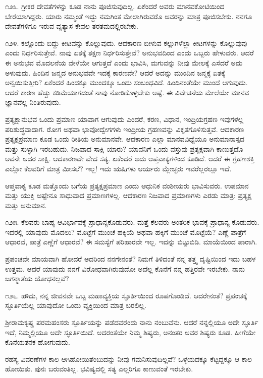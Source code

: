 ೧೨೩. ಗ್ರೀಕರ ದೇವತೆಗಳನ್ನು ಕೂಡ ನಾನು ಪೂಜಿಸುವುದಿಲ್ಲ. ಏಕೆಂದರೆ ಅವರು ಮಾನವಕೋಟಿಯಿಂದ ಬೇರೆಯಾಗಿದ್ದರು. ಯಾರು ನಮ್ಮಂತೆ ಇದ್ದು ನಮಗಿಂತ ಮೇಲಾಗಿರುವರೊ ಅವರನ್ನು ಮಾತ್ರ ಪೂಜಿಸಬೇಕು. ನನಗೂ ದೇವತೆಗಳಿಗೂ ಇರುವ ವ್ಯತ್ಯಾಸ ಕೇವಲ ತರತಮದಲ್ಲಿರಬೇಕು.

೧೨೪. ಕಲ್ಲೊಂದು ಬಿದ್ದು ಕೀಟವನ್ನು ಕೊಲ್ಲುವುದು. ಆದಕಾರಣ ಬೀಳುವ ಕಲ್ಲುಗಳೆಲ್ಲಾ ಕೀಟಗಳನ್ನು ಕೊಲ್ಲುವುವು ಎಂದು ನಿರ್ಧರಿಸುತ್ತೇವೆ. ನಾವು ಏತಕ್ಕೆ ತಕ್ಷಣ ನಿರ್ಧರಿಸುತ್ತೇವೆ? ಅನುಭವದಿಂದ ಎಂದು ಒಬ್ಬರು ಹೇಳುವರು. ಆದರೆ ಈ ಅನುಭವ ಮೊದಲನೆಯ ವೇಳೆಯೇ ಆಗುತ್ತದೆ ಎಂದು ಭಾವಿಸಿ, ಮಗುವನ್ನು ನೀವು ಮೇಲಕ್ಕೆ ಎಸೆದರೆ ಅದು ಅಳುವುದು. ಹಿಂದಿನ ಜನ್ಮದ ಅನುಭವವೇ ಇದಕ್ಕೆ ಕಾರಣವೇ? ಆದರೆ ಅದನ್ನು ಮುಂದಿನ ಜನ್ಮಕ್ಕೆ ಏತಕ್ಕೆ ಅನ್ವಯಿಸುತ್ತೀರಿ? ಏಕೆಂದರೆ ಹಿಂದಕ್ಕೂ ಮುಂದಕ್ಕೂ ಒಂದು ಸಂಬಂಧವಿದೆ. ಹಿಂದಿನಂತೆಯೇ ಮುಂದೆ ಆಗುವುದು. ಆದರೆ ಕಾರಣ ಹೆಚ್ಚು ಕಡಿಮೆಯಾಗದಂತೆ ನಾವು ನೋಡಿಕೊಳ್ಳಬೇಕು ಅಷ್ಟೆ. ಈ ವಿವೇಚನೆಯ ಮೇಲೆಯೇ ಮಾನವ ಜ್ಞಾನವೆಲ್ಲ ನಿಂತಿರುವುದು.

ಪ್ರತ್ಯಕ್ಷಾನುಭವ ಒಂದು ಪ್ರಮಾಣ ಯಾವಾಗ ಆಗುವುದು ಎಂದರೆ, ಕರಣ, ವಿಧಾನ, ಇಂದ್ರಿಯಗ್ರಹಣ ಇವುಗಳೆಲ್ಲ ಪರಿಶುದ್ಧವಾದಾಗ. ರೋಗ ಅಥವಾ ಭಾವೋದ್ವೇಗಗಳು ಇಂದ್ರೀಯ ಗ್ರಹಣವನ್ನು ವಿಕೃತಗೊಳಿಸುತ್ತವೆ. ಆದಕಾರಣ ಪ್ರತ್ಯಕ್ಷಪ್ರಮಾಣ ಕೂಡ ಒಂದು ರೀತಿಯ ಅನುಮಾನವೇ. ಆದಕಾರಣ ಎಲ್ಲಾ ಮಾನವವಿಧ್ಯೆಯೂ ಅನುಮಾನಾಸ್ಪದ ಮತ್ತು ಸುಳ್ಳಾಗಿ ಇರಬಹುದು. ನಿಜವಾದ ಸಾಕ್ಷಿ ಯಾರು? ಯಾವನಿಗೆ ಒಂದು ವಸ್ತುವು ಪ್ರತ್ಯಕ್ಷವಾಗಿ ಕಾಣುತ್ತದೊ ಅವನೇ ಅದರ ಸಾಕ್ಷಿ. ಆದಕಾರಣವೇ ವೇದ ಸತ್ಯ. ಏಕೆಂದರೆ ಅದು ಆಪ್ತವಾಕ್ಯಗಳಿಂದ ಕೂಡಿದೆ. ಆದರೆ ಈ ಗ್ರಹಣಶಕ್ತಿ ಎಲ್ಲೋ ಕೆಲವರಿಗೆ ಮಾತ್ರ ಮೀಸಲೆ? ಇಲ್ಲ! ಇದು ಋಷಿಗಳು ಆರ್ಯರು ಮ್ಲೇಚ್ಛರು ಇವರೆಲ್ಲರಲ್ಲೂ ಇದೆ.

ಆಪ್ತವಾಕ್ಯ ಕೂಡ ಮತ್ತೊಂದು ಬಗೆಯ ಪ್ರತ್ಯಕ್ಷಪ್ರಮಾಣ ಎಂದು ಆಧುನಿಕ ವಂಶೀಯರು ಭಾವಿಸುವರು. ಉಪಮಾನ ಮತ್ತು ಯುಕ್ತಿ ಅಷ್ಟೇನೂ ಸಾಧುವಾದ ಪ್ರಮಾಣಗಳಲ್ಲ. ಆದಕಾರಣ ನಿಜವಾದ ಪ್ರಮಾಣಗಳು ಎರಡು ಮಾತ್ರ: ಪ್ರತ್ಯಕ್ಷ ಮತ್ತು ಅನುಮಾನ.

೧೨೫. ಕೆಲವರು ಬಾಹ್ಯ ಆವಿರ್ಭಾವಕ್ಕೆ ಪ್ರಾಧಾನ್ಯಕೊಡುವರು. ಮತ್ತೆ ಕೆಲವರು ಅಂತರಿಕ ಭಾವಕ್ಕೆ ಪ್ರಾಧಾನ್ಯ ಕೊಡುವರು. ಇದರಲ್ಲಿ ಯಾವುದು ಮೊದಲು? ಮೊಟ್ಟೆಗೆ ಮುಂಚೆ ಹಕ್ಕಿಯೆ ಅಥವಾ ಹಕ್ಕಿಗೆ ಮುಂಚೆ ಮೊಟ್ಟೆಯೆ? ಎಣ್ಣೆ ಪಾತ್ರೆಗೆ ಆಧಾರವೆ, ಪಾತ್ರೆ ಎಣ್ಣೆಗೆ ಆಧಾರವೆ? ಈ ಸಮಸ್ಯೆಗೆ ಪರಿಹಾರವೇ ಇಲ್ಲ. ಇದನ್ನು ಬಿಟ್ಟುಬಿಡಿ. ಮಾಯೆಯಿಂದ ಪಾರಾಗಿ.

ಪ್ರಪಂಚವೇ ಮಾಯವಾಗಿ ಹೋದರೆ ಅದರಿಂದ ನನಗೇನಂತೆ? ನಿಮಗೆ ತಿಳಿದಂತೆ ನನ್ನ ತತ್ತ್ವ ದೃಷ್ಟಿಯಿಂದ ಇದು ಬಹಳ ಉತ್ತಮ. ಆದರೆ ಯಾವುದು ನನಗೆ ವಿರೋಧವಾಗಿರುವುದೋ ಅದೆಲ್ಲ ಕೊನೆಗೆ ನನ್ನ ಹತ್ತಿರವೇ ಇರಬೇಕು. ನಾನು ಜಗನ್ಮಾತೆಯ ಯೋಧನಲ್ಲವೆ?

೧೨೬. ಹೌದು, ನನ್ನ ಜೀವನವೇ ಒಬ್ಬ ಮಹಾವ್ಯಕ್ತಿಯ ಸ್ಫೂರ್ತಿಯಿಂದ ರೂಪಗೊಂಡಿದೆ. ಆದರೇನಂತೆ? ಪ್ರಪಂಚಕ್ಕೆ ಸ್ಫೂರ್ತಿಯೆಲ್ಲ ಯಾವುದೋ ಒಂದು ವ್ಯಕ್ತಿಯಿಂದ ಮಾತ್ರ ಬರಲಿಲ್ಲ.

ಶ‍್ರೀರಾಮಕೃಷ್ಣ ಪರಮಹಂಸರು ಸ್ಫೂರ್ತಿಯನ್ನು ಪಡೆದವರೆಂದು ನಾನು ನಂಬುವೆನು. ಆದರೆ ನನ್ನಲ್ಲಿಯೂ ಅದೇ ಸ್ಫೂರ್ತಿ ಇದೆ, ನಿಮ್ಮಲ್ಲಿಯೂ ಅದೇ ಸ್ಫೂರ್ತಿಯಿದೆ. ಅದರಂತೆಯೇ ನಿಮ್ಮ ಶಿಷ್ಯರು, ಅನಂತರ ಅವರ ಶಿಷ್ಯರು ಕೂಡ. ಹೀಗೆಯೇ ಕೊನೆಯತನಕ ಹೋಗುವುದು.

ರಹಸ್ಯ ವಿವರಣೆಗಳ ಕಾಲ ಆಗಿಹೋಯಿತೆಂಬುದನ್ನು ನೀವು ಗಮನಿಸುವುದಿಲ್ಲವೆ? ಒಳ್ಳೆಯದಕ್ಕೂ ಕೆಟ್ಟದ್ದಕ್ಕೂ ಆ ಕಾಲ ಹೋಯಿತು. ಪುನಃ ಬರುವಂತಿಲ್ಲ. ಭವಿಷ್ಯದಲ್ಲಿ ಸತ್ಯ ಎಲ್ಲರಿಗೂ ಕಾಣುವಂತೆ ಇರಬೇಕು.

